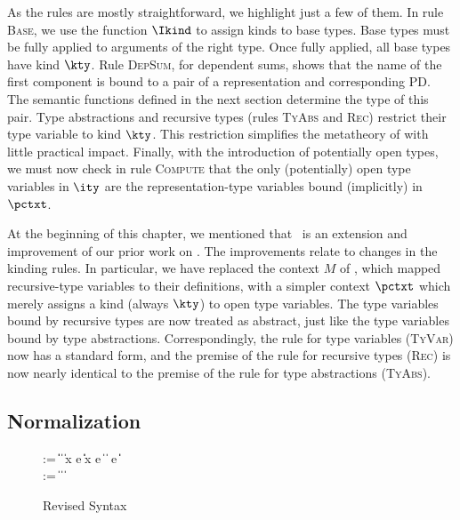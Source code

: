 As the rules are mostly straightforward, we highlight just a few of
them. In rule \textsc{Base}, we use the function $\Ikind$ to assign
kinds to base types.  Base types must be fully applied to arguments of
the right type.  Once fully applied, all base types have kind $\kty$.
Rule \textsc{DepSum}, for dependent sums, shows that the name of the first component is
bound to a pair of a representation and corresponding PD.  The
semantic functions defined in the next section determine the type of
this pair. Type abstractions and recursive types (rules \textsc{TyAbs}
and \textsc{Rec}) restrict their type
variable to kind $\kty$. This restriction simplifies the metatheory
of \ddc{} with little practical impact.
Finally, with the introduction of potentially open \implang types, we
must now check in rule \textsc{Compute} that the only (potentially)
open type variables in $\ity$ are the representation-type variables
bound (implicitly) in $\pctxt$.

At the beginning of this chapter, we mentioned that \ddc\ is an
extension and improvement of our prior work on \ddcold. The
improvements relate to changes in the kinding rules. In particular, we
have replaced the context $M$ of \ddcold{}, which mapped
recursive-type variables to their definitions, with a simpler context
$\pctxt$ which merely assigns a kind (always $\kty$) to open type
variables.  The type variables bound by recursive types are now
treated as abstract, just like the type variables bound by type
abstractions.  Correspondingly, the rule for type variables
(\textsc{TyVar}) now has a standard form, and the premise of the rule
for recursive types (\textsc{Rec}) is now nearly identical to the
premise of the rule for type abstractions (\textsc{TyAbs}).

\subsection{\ddc{} Normalization}
\label{sec:ddc-norm}

\begin{figure}
\begin{bnf}
   \meta{\tyval} \::= 
    \ptrue\| \pfalse \|  \| \plam{\var}{\ity}{\ty} \|
    \psig x \ty \ty  \nlalt
    \psum \ty e \ty  \| \pand \ty \ty \|
    \pset x \ty e \|
    \pseq \ty {} \nlalt
    \pmu{\ptyvar}{}{\ty}  \| \plam{\ptyvar}{}{\ty} \nlalt
    \pcompute e \ity \| \pabsorb \ty \| \pscan{\ty} 
    \\
   \meta{\ty} \::= \tyval \|  \|
                               \papp{\ty}{\ty} \| \ptyvar
\end{bnf}
  \caption{Revised \ddc{} Syntax}
  \label{fig:revised-ddc-syntax}
\end{figure}

